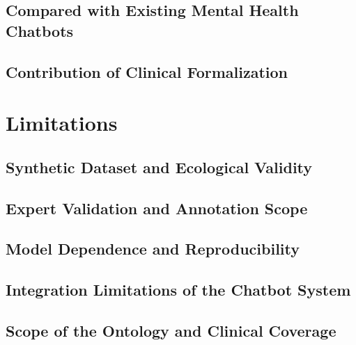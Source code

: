 
\subsection{Compared with Existing Mental Health Chatbots}


\subsection{Contribution of Clinical Formalization}


\section{Limitations}


\subsection{Synthetic Dataset and Ecological Validity}


\subsection{Expert Validation and Annotation Scope}


\subsection{Model Dependence and Reproducibility}


\subsection{Integration Limitations of the Chatbot System}


\subsection{Scope of the Ontology and Clinical Coverage}


